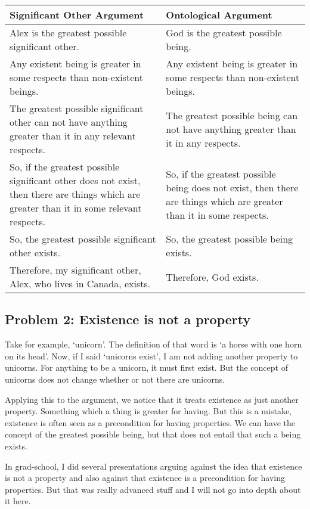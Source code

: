 \noindent
\begin{tabular}{p{2.75in}|p{2.75in}}
Significant Other Argument&Ontological Argument\\\hline
    Alex is the greatest possible significant other.&God is the greatest possible being.\\
    Any existent being is greater in some respects than non-existent beings.&Any existent being is greater in some respects than non-existent beings.\\
    The greatest possible significant other can not have anything greater than it in any relevant respects.&The greatest possible being can not have anything greater than it in any respects.\\
    So, if the greatest possible significant other does not exist, then there are things which are greater than it in some relevant respects.&So, if the greatest possible being does not exist, then there are things which are greater than it in some respects.\\
    So, the greatest possible significant other exists.&So, the greatest possible being exists.\\
    Therefore, my significant other, Alex, who lives in Canada, exists.&Therefore, God exists.\\
\end{tabular}
 
\subsection{Problem 2: Existence is not a property}

Take for example, ‘unicorn’. The definition of that word is ‘a horse with one horn on its head’. Now, if I said ‘unicorns exist’, I am not adding another property to unicorns. For anything to be a unicorn, it must first exist. But the concept of unicorns does not change whether or not there are unicorns.

Applying this to the argument, we notice that it treats existence as just another property. Something which a thing is greater for having. But this is a mistake, existence is often seen as a precondition for having properties. We can have the concept of the greatest possible being, but that does not entail that such a being exists.

In grad-school, I did several presentations arguing against the idea that existence is not a property and also against that existence is a precondition for having properties. But that was really advanced stuff and I will not go into depth about it here.

